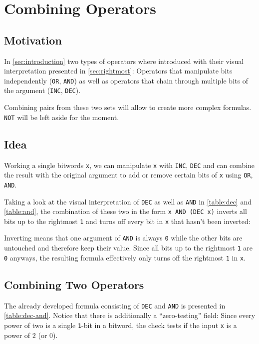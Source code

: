 \section{Combining Operators}\label{sec:combining}

\subsection*{Motivation}
In \autoref{sec:introduction} two types of operators where introduced
with their visual interpretation presented in \autoref{sec:rightmost}:
Operators that manipulate bits independently
(\lstinline$OR$, \lstinline$AND$)
as well as operators that chain through multiple bits of the argument
(\lstinline$INC$, \lstinline$DEC$).

Combining pairs from these two sets will allow
to create more complex formulas.
\lstinline$NOT$ will be left aside for the moment.


\subsection*{Idea}
Working a single bitwords \lstinline$x$, we can
manipulate \lstinline$x$ with \lstinline$INC$, \lstinline$DEC$
and can combine the result with the original argument
to add or remove certain bits of \lstinline$x$
using \lstinline$OR$, \lstinline$AND$.

Taking a look at the visual interpretation
of \lstinline$DEC$ as well as \lstinline$AND$
in \autoref{table:dec} and \autoref{table:and},
the combination of these two in the form \lstinline$x AND (DEC x)$
inverts all bits up to the rightmost \lstinline$1$
and turns off every bit in \lstinline$x$ that hasn't been inverted:

Inverting means that one argument of \lstinline$AND$ is always \lstinline$0$
while the other bits are untouched and therefore keep their value.
Since all bits up to the rightmost \lstinline$1$ are \lstinline$0$ anyways,
the resulting formula effectively only turns off the rightmost \lstinline$1$
in \lstinline$x$.


\subsection*{Combining Two Operators}
The already developed formula
consisting of \lstinline$DEC$ and \lstinline$AND$
is presented in \autoref{table:dec-and}.
Notice that there is additionally a ``zero-testing'' field:
Since every power of two is a single \lstinline$1$-bit in a bitword,
the check tests if the input \lstinline$x$ is a power of $2$ (or $0$).

